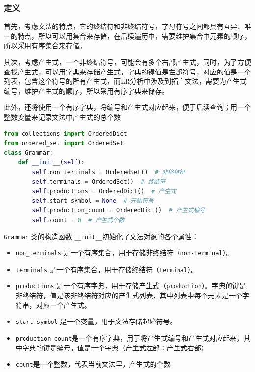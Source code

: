 \documentclass[lang=cn,11pt,a4paper]{elegantpaper}
\begin{document}
\subsubsection{定义}

首先，考虑文法的特点，它的终结符和非终结符号，字母符号之间都具有互异、唯一的特点，所以可以用集合来存储，在后续遍历中，需要维护集合中元素的顺序，所以采用有序集合来存储。

其次，考虑产生式，一个非终结符号，可能会有多个右部产生式，同时，为了方便查找产生式，可以用字典来存储产生式，字典的键值是左部符号，对应的值是一个列表，包含这个符号的所有产生式，而LR分析中涉及到拓广文法，需要为产生式编号，维护产生式的顺序，所以采用有序字典来储存。

此外，还将使用一个有序字典，将编号和产生式对应起来，便于后续查询；用一个整数变量来记录文法中产生式的总个数

\begin{lstlisting}[language=Python]
from collections import OrderedDict
from ordered_set import OrderedSet
class Grammar:
    def __init__(self):
        self.non_terminals = OrderedSet()  # 非终结符
        self.terminals = OrderedSet()  # 终结符
        self.productions = OrderedDict()  # 产生式
        self.start_symbol = None  # 开始符号
        self.production_count = OrderedDict()  # 产生式编号
        self.count = 0  # 产生式个数
\end{lstlisting}

\lstinline{Grammar} 类的构造函数 \lstinline{__init__}初始化了文法对象的各个属性：
\begin{itemize}
    \item \lstinline{non_terminals} 是一个有序集合，用于存储非终结符（\lstinline{non-terminal}）。
    \item \lstinline{terminals} 是一个有序集合，用于存储终结符（\lstinline{terminal}）。
    \item \lstinline{productions} 是一个有序字典，用于存储产生式（\lstinline{production}）。字典的键是非终结符，值是该非终结符对应的产生式列表，其中列表中每个元素是一个字符串，对应一个产生式。
    \item \lstinline{start_symbol} 是一个变量，用于文法存储起始符号。
    \item \lstinline{production_count}是一个有序字典，用于将产生式编号和产生式对应起来，其中字典的键是编号，值是一个字典（产生式左部：产生式右部）
    \item \lstinline{count}是一个整数，代表当前文法里，产生式的个数
\end{itemize}
\end{document}
